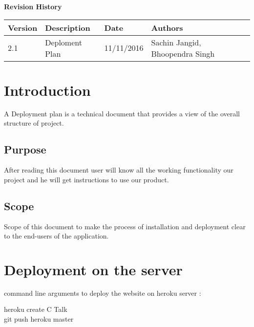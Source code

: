 \documentclass[12pt]{article}
\begin{document}
	\textbf{Revision History}
	\begin{center}
		\begin{tabular}{ | m{3em} | m{8em} | m{5em} | m{4em} | m{4em} | }
			\hline
			Version & Description & Date       & Authors             \\
			\hline
			2.1     & Deploment Plan    & 11/11/2016 & Sachin Jangid, Bhoopendra Singh   \\ 

			\hline
		
		\end{tabular}
	\end{center}
	
	\newpage
	\hline
\tableofcontents
\newpage

\section{Introduction}
A Deployment plan is a technical document that provides a view of the overall structure of project. 
\\

\subsection{Purpose}
After reading this document user will know all the working functionality our project and he will get instructions to use our product. 


 \subsection{Scope}
 Scope of this document to make the process of installation and deployment clear to the end-users of the application.
 
 
\section{Deployment on the server}
command line arguments to deploy the website on heroku server :

heroku create C Talk \\
git push heroku master\\
	
	
\end{document}
